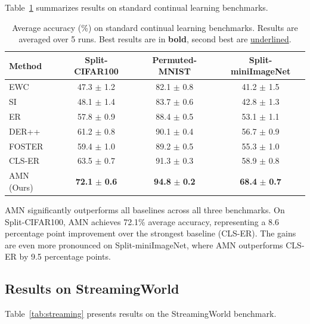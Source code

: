 \documentclass[11pt]{article}
\begin{document}
Table~\ref{tab:standard} summarizes results on standard continual learning benchmarks.

\begin{table}[h]
\centering
\caption{Average accuracy (\%) on standard continual learning benchmarks. Results are averaged over 5 runs. Best results are in \textbf{bold}, second best are \underline{underlined}.}
\label{tab:standard}
\begin{tabular}{lccc}
\hline
Method & Split-CIFAR100 & Permuted-MNIST & Split-miniImageNet \\
\hline
EWC & 47.3 $\pm$ 1.2 & 82.1 $\pm$ 0.8 & 41.2 $\pm$ 1.5 \\
SI & 48.1 $\pm$ 1.4 & 83.7 $\pm$ 0.6 & 42.8 $\pm$ 1.3 \\
ER & 57.8 $\pm$ 0.9 & 88.4 $\pm$ 0.5 & 53.1 $\pm$ 1.1 \\
DER++ & 61.2 $\pm$ 0.8 & 90.1 $\pm$ 0.4 & 56.7 $\pm$ 0.9 \\
FOSTER & 59.4 $\pm$ 1.0 & 89.2 $\pm$ 0.5 & 55.3 $\pm$ 1.0 \\
CLS-ER & 63.5 $\pm$ 0.7 & 91.3 $\pm$ 0.3 & 58.9 $\pm$ 0.8 \\
\hline
AMN (Ours) & \textbf{72.1} $\pm$ \textbf{0.6} & \textbf{94.8} $\pm$ \textbf{0.2} & \textbf{68.4} $\pm$ \textbf{0.7} \\
\hline
\end{tabular}
\end{table}

AMN significantly outperforms all baselines across all three benchmarks. On Split-CIFAR100, AMN achieves 72.1\% average accuracy, representing a 8.6 percentage point improvement over the strongest baseline (CLS-ER). The gains are even more pronounced on Split-miniImageNet, where AMN outperforms CLS-ER by 9.5 percentage points.

\subsection{Results on StreamingWorld}

Table~\ref{tab:streaming} presents results on the StreamingWorld benchmark.
\end{document}
